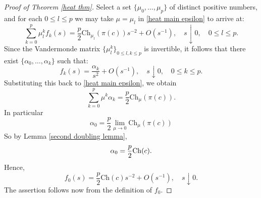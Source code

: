 \begin{proof}[Proof of Theorem \ref{heat thm}]
        Select a set $\{\mu_0,\ldots,\mu_p\}$ of distinct positive numbers, and for each $0 \leq l \leq p$ we may take $\mu = \mu_l$ in \eqref{heat main epsilon}
        to arrive at:
        $$\sum_{k=0}^p\mu_l^kf_k(s) = \frac{p}{2}\mathrm{Ch}_{\mu_l}(\pi(c))s^{-2} + O(s^{-1}),\quad s\downarrow 0,\quad 0\leq l\leq p.$$
        Since the Vandermonde matrix $\{\mu_l^k\}_{0\leq l,k\leq p}$ is invertible, it follows that there exist $\{\alpha_0,\ldots, \alpha_k\}$
        such that:
        $$f_k(s)=\frac{\alpha_k}{s^2}+O(s^{-1}),\quad s\downarrow0,\quad 0\leq k\leq p.$$
        Substituting this back to \eqref{heat main epsilon}, we obtain
        $$\sum_{k=0}^p\mu^k\alpha_k=\frac{p}{2}\mathrm{Ch}_{\mu}(\pi(c)).$$
        In particular
        $$\alpha_0=\frac{p}{2}\lim_{\mu\to0}\mathrm{Ch}_{\mu}(\pi(c))$$
        So by Lemma \ref{second doubling lemma},
        \begin{equation*}
            \alpha_0 = \frac{p}{2}{\rm Ch}(c).
        \end{equation*}
        Hence,
        $$f_0(s)=\frac{p}{2}\mathrm{Ch}(c)s^{-2} + O(s^{-1}),\quad s\downarrow 0.$$
        The assertion follows now from the definition of $f_0.$
    \end{proof}

    